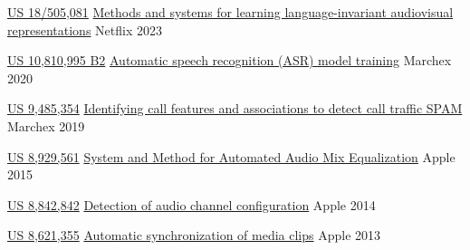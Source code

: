 
\begin{cvhonors}


  \cvhonor
    {\href{https://patents.google.com/patent/US20240161500A1/en?inventor=Iroro+Orife}{US 18/505,081}} %
    {\href{https://patents.google.com/patent/US20240161500A1/en?inventor=Iroro+Orife}{Methods and systems for learning language-invariant audiovisual representations}} %
    {Netflix} %
    {2023} %


  \cvhonor
    {\href{https://patents.google.com/patent/US10810995B2/en?inventor=Iroro+Orife}{US 10,810,995 B2}} %
    {\href{https://patents.google.com/patent/US10810995B2/en?inventor=Iroro+Orife}{Automatic speech recognition (ASR) model training}} %
    {Marchex} %
    {2020} %

  \cvhonor
    {\href{https://patents.google.com/patent/US9485354B1/en?inventor=Iroro+Orife}{US 9,485,354}} %
    {\href{https://patents.google.com/patent/US9485354B1/en?inventor=Iroro+Orife}{Identifying call features and associations to detect call traffic SPAM}} %
    {Marchex} %
    {2019} %

  \cvhonor
    {\href{https://patents.google.com/patent/US20120237040A1/en?inventor=Iroro+Orife}{US 8,929,561}} %
    {\href{https://patents.google.com/patent/US20120237040A1/en?inventor=Iroro+Orife}{System and Method for Automated Audio Mix Equalization}} %
    {Apple} %
    {2015} %

  \cvhonor
    {\href{https://patents.google.com/patent/US20120195433A1/en?inventor=Iroro+Orife}{US 8,842,842}} %
    {\href{https://patents.google.com/patent/US20120195433A1/en?inventor=Iroro+Orife}{Detection of audio channel configuration}} %
    {Apple} %
    {2014} %

  \cvhonor
    {\href{https://patents.google.com/patent/US20120198317A1/en?inventor=Iroro+Orife}{US 8,621,355}} %
    {\href{https://patents.google.com/patent/US20120198317A1/en?inventor=Iroro+Orife}{Automatic synchronization of media clips}} %
    {Apple} %
    {2013} %
    
    
    
    
    
\end{cvhonors}
